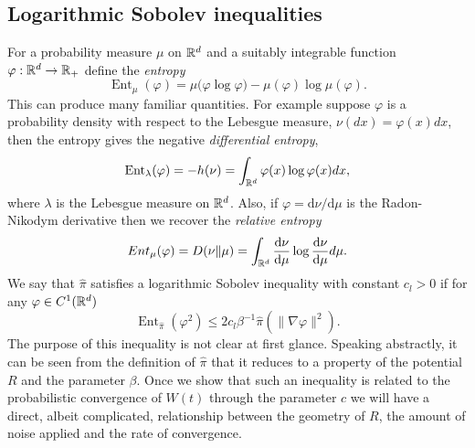 \documentclass{article}
\newcommand{\Brm}[1]{\mathrm{#1}}
\begin{document}
\subsection{Logarithmic Sobolev inequalities}\label{sec:log_sob}
For a probability measure \(\mu\) on \(\Bbb{R}^d\) and a suitably integrable function \(\varphi: \Bbb{R}^d \to \Bbb{R}_+\) define the \textit{entropy}
\begin{equation*}
    \operatorname{Ent}_{\mu}(\varphi) = \mu \big (\varphi \log{\varphi} \big ) - \mu(\varphi)\log \mu(\varphi).
\end{equation*}
This can produce many familiar quantities. For example suppose \(\varphi\) is a probability density with respect to the Lebesgue measure, \(\nu(dx) = \varphi(x)dx\), then the entropy gives the negative \textit{differential entropy},
\begin{equation*}
    \operatorname{Ent}_{\lambda}(\varphi) = -h(\nu) = \int_{\Bbb{R}^d} \varphi(x) \log{\varphi(x)} dx,
\end{equation*}
where \(\lambda\) is the Lebesgue measure on \(\Bbb{R}^d\). Also, if \(\varphi = \Brm{d}\nu / \Brm{d}\mu\) is the Radon-Nikodym derivative then we recover the \textit{relative entropy}
\begin{equation*}
    Ent_{\mu}(\varphi) = D(\nu \| \mu) = \int_{\Bbb{R}^d} \frac{\Brm{d} \nu}{\Brm{d} \mu} \log{\frac{\Brm{d} \nu}{\Brm{d} \mu}} d\mu.
\end{equation*}
We say that \(\hat{\pi}\) satisfies a logarithmic Sobolev inequality with constant \(c_l > 0\) if for any \(\varphi \in C^1(\Bbb{R}^d)\)
\begin{equation*}
    \operatorname{Ent}_{\hat{\pi}}(\varphi^2) \leq 2 c_l \beta^{-1} \hat{\pi}(\|\nabla \varphi\|^2).
\end{equation*}
The purpose of this inequality is not clear at first glance. Speaking abstractly, it can be seen from the definition of \(\hat{\pi}\) that it reduces to a property of the potential \(R\) and the parameter \(\beta\). Once we show that such an inequality is related to the probabilistic convergence of \(W(t)\) through the parameter \(c\) we will have a direct, albeit complicated, relationship between the geometry of \(R\), the amount of noise applied and the rate of convergence.
\end{document}

